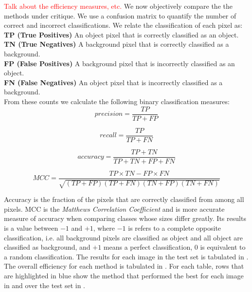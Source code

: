 \begin{definition}
	\textcolor{red}{Talk about the efficiency measures, etc.} We now objectively compare the the methods under critique. We use a confusion matrix to quantify the number of correct and incorrect classifications. We relate the classification of each pixel as:\\
	\textbf{TP (True Positives)} An object pixel that is correctly classified as an object.\\
	\textbf{TN (True Negatives)} A background pixel that is correctly classified as a background.\\
	\textbf{FP (False Positives)} A background pixel that is incorrectly classified as an object.\\
	\textbf{FN (False Negatives)} An object pixel that is incorrectly classified as a background.\\

	From these counts we calculate the following binary classification measures:
	\begin{equation*}
		precision = \frac{TP}{TP+FP}
	\end{equation*}
	
	\begin{equation*}
		recall = \frac{TP}{TP+FN}
	\end{equation*}
	
	\begin{equation*}
		accuracy = \frac{TP+TN}{TP+TN+FP+FN}
	\end{equation*}
	
	\begin{equation*}
		MCC = \frac{TP \times TN - FP \times FN}{\sqrt{\left( TP + FP \right) \left( TP + FN \right) \left( TN + FP \right) \left( TN + FN \right)}}
	\end{equation*}
\end{definition}

Accuracy is the fraction of the pixels that are correctly classified from among all pixels. MCC is the \textit{Matthews Correlation Coefficient} and is more accurate measure of accuracy when comparing classes whose sizes differ greatly. Its results is a value between $-1$ and $+1$, where $-1$ is refers to a complete opposite classification, i.e. all background pixels are classified as object and all object are classified as background, and $+1$ means a perfect classification, $0$ is equivalent to a random classification. The results for each image in the test set is tabulated in . The overall efficiency for each method is tabulated in . For each table, rows that are highlighted in blue show the method that performed the best for each image in  and over the test set in .

